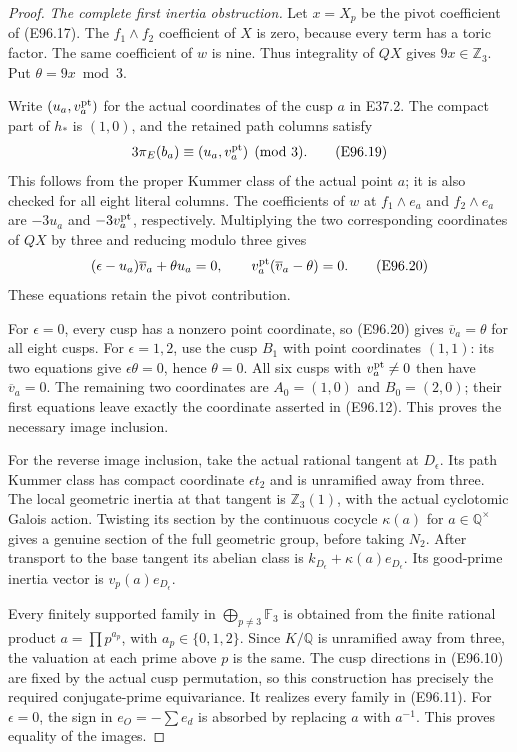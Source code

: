 \begin{proof}
\emph{The complete first inertia obstruction.}
Let $x=X_p$ be the pivot coefficient of (E96.17).
The $f_1\wedge f_2$ coefficient of $X$ is zero,
because every term has a toric factor. The same
coefficient of $w$ is nine. Thus integrality of
$QX$ gives $9x\in\mathbb Z_3$. Put
$\theta=9x\bmod3$.

Write $(u_a,v_a^{\rm pt})$ for the actual coordinates
of the cusp $a$ in E37.2. The compact part of $h_*$
is $(1,0)$, and the retained path columns satisfy
\[
 3\pi_E(b_a)\equiv(u_a,v_a^{\rm pt})\pmod3.
 \tag{E96.19}
\]
This follows from the proper Kummer class of the
actual point $a$; it is also checked for all eight
literal columns. The coefficients of $w$ at
$f_1\wedge e_a$ and $f_2\wedge e_a$ are
$-3u_a$ and $-3v_a^{\rm pt}$, respectively.
Multiplying the two corresponding coordinates of
$QX$ by three and reducing modulo three gives
\[
 (\epsilon-u_a)\overline v_a+\theta u_a=0,
 \qquad
 v_a^{\rm pt}(\overline v_a-\theta)=0.
 \tag{E96.20}
\]
These equations retain the pivot contribution.

For $\epsilon=0$, every cusp has a nonzero point
coordinate, so (E96.20) gives $\overline v_a=\theta$
for all eight cusps. For $\epsilon=1,2$, use the
cusp $B_1$ with point coordinates $(1,1)$: its two
equations give $\epsilon\theta=0$, hence $\theta=0$.
All six cusps with $v_a^{\rm pt}\ne0$ then have
$\overline v_a=0$. The remaining two coordinates
are $A_0=(1,0)$ and $B_0=(2,0)$; their first equations
leave exactly the coordinate asserted in (E96.12).
This proves the necessary image inclusion.

For the reverse image inclusion, take the actual
rational tangent at $D_\epsilon$. Its path Kummer
class has compact coordinate $\epsilon t_2$ and is
unramified away from three. The local geometric
inertia at that tangent is $\mathbb Z_3(1)$, with
the actual cyclotomic Galois action. Twisting its
section by the continuous cocycle $\kappa(a)$ for
$a\in\mathbb Q^\times$ gives a genuine section of
the full geometric group, before taking $N_2$.
After transport to the base tangent its abelian
class is $k_{D_\epsilon}+\kappa(a)e_{D_\epsilon}$.
Its good-prime inertia vector is
$v_p(a)e_{D_\epsilon}$.

Every finitely supported family in
$\bigoplus_{p\ne3}\mathbb F_3$ is obtained from the
finite rational product $a=\prod p^{a_p}$, with
$a_p\in\{0,1,2\}$. Since $K/\mathbb Q$ is unramified
away from three, the valuation at each prime above
$p$ is the same. The cusp directions in (E96.10)
are fixed by the actual cusp permutation, so this
construction has precisely the required conjugate-prime
equivariance. It realizes every family in (E96.11).
For $\epsilon=0$, the sign in $e_O=-\sum e_d$ is
absorbed by replacing $a$ with $a^{-1}$.
This proves equality of the images.


\end{proof}
